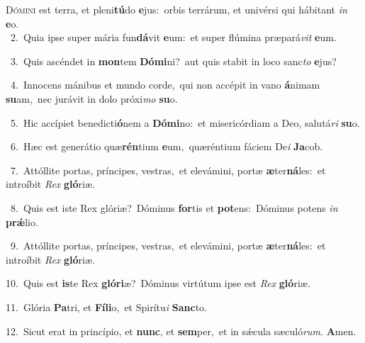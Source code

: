 \lettrine{\initial\textcolor{\initialcolor}{D}}{ómini} est terra, et pleni\-\textbf{tú}\-do \textbf{e}\-jus:~\star orbis terrárum, et univérsi qui hábitant \textit{in} \textbf{e}\-o.\\
{\numbfont\textcolor{\numbcolor}{~2.}}~Quia ipse super mária fun\-\textbf{dá}\-vit \textbf{e}\-um:~\star et super flúmina præpará\textit{vit} \textbf{e}\-um.\par
{\numbfont\textcolor{\numbcolor}{~3.}}~Quis ascéndet in \textbf{mon}\-tem \textbf{Dó}\-\textbf{mi}ni?~\star aut quis stabit in loco sanc\textit{to} \textbf{e}\-jus?\par
{\numbfont\textcolor{\numbcolor}{~4.}}~Innocens mánibus et mundo corde,~\dagger qui non accépit in vano \textbf{á}\-nimam \textbf{su}\-am,~\star nec jurávit in dolo próxi\textit{mo} \textbf{su}\-o.\par
{\numbfont\textcolor{\numbcolor}{~5.}}~Hic accípiet benedicti\-\textbf{ó}\-nem a \textbf{Dó}\-\textbf{mi}no:~\star et misericórdiam a Deo, salutá\textit{ri} \textbf{su}\-o.\par
{\numbfont\textcolor{\numbcolor}{~6.}}~Hæc est generátio quæ\-\textbf{rén}\-tium \textbf{e}\-um,~\star quæréntium fáciem De\textit{i} \textbf{Ja}\-cob.\par
{\numbfont\textcolor{\numbcolor}{~7.}}~Attóllite portas, príncipes, vestras,~\dagger et elevámini, portæ \textbf{æ}\-ter\-\textbf{ná}\-les:~\star et introíbit \textit{Rex} \textbf{gló}\-riæ.\par
{\numbfont\textcolor{\numbcolor}{~8.}}~Quis est iste Rex glóriæ?~\dagger Dóminus \textbf{for}\-tis et \textbf{pot}\-ens:~\star Dóminus potens \textit{in} \textbf{prǽ}\-lio.\par
{\numbfont\textcolor{\numbcolor}{~9.}}~Attóllite portas, príncipes, vestras,~\dagger et elevámini, portæ \textbf{æ}\-ter\-\textbf{ná}\-les:~\star et introíbit \textit{Rex} \textbf{gló}\-riæ.\par
{\numbfont\textcolor{\numbcolor}{10.}}~Quis est \textbf{is}\-te Rex \textbf{gló}\-\textbf{ri}æ?~\star Dóminus virtútum ipse est \textit{Rex} \textbf{gló}\-riæ.\par
{\numbfont\textcolor{\numbcolor}{11.}}~Glória \textbf{Pa}\-tri, et \textbf{Fí}\-\textbf{li}o,~\star et Spirítu\textit{i} \textbf{Sanc}\-to.\par
{\numbfont\textcolor{\numbcolor}{12.}}~Sicut erat in princípio, et \textbf{nunc}\-, et \textbf{sem}\-per,~\star et in sǽcula sæculó\-\textit{rum}\-. \textbf{A}\-men.\par
